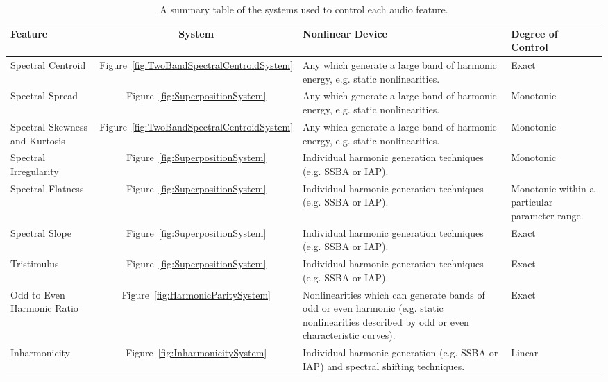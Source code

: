 	\begin{table}[h!]
		\centering
		\begin{tabular}{|C{3cm}|c|C{5cm}|C{3cm}|}
			\hline
			\bf{Feature} & \bf{System} & \bf{Nonlinear Device} & \bf{Degree of Control} \tabularnewline
			\hline
			\hline
			Spectral Centroid & Figure~\ref{fig:TwoBandSpectralCentroidSystem} & 
			Any which generate a large band of harmonic energy, e.g. static nonlinearities. & 
			Exact \tabularnewline
			\hline
			Spectral Spread & Figure~\ref{fig:SuperpositionSystem} & 
			Any which generate a large band of harmonic energy, e.g. static nonlinearities. & 
			Monotonic \tabularnewline
			\hline
			Spectral Skewness and Kurtosis & Figure~\ref{fig:TwoBandSpectralCentroidSystem} & 
			Any which generate a large band of harmonic energy, e.g. static nonlinearities. & 
			Monotonic \tabularnewline
			\hline
			Spectral Irregularity & Figure~\ref{fig:SuperpositionSystem} & 
			Individual harmonic generation techniques (e.g. SSBA or IAP). & 
			Monotonic \tabularnewline
			\hline
			Spectral Flatness & Figure~\ref{fig:SuperpositionSystem} &
			Individual harmonic generation techniques (e.g. SSBA or IAP). & 
			Monotonic within a particular parameter range. \tabularnewline
			\hline
			Spectral Slope & Figure~\ref{fig:SuperpositionSystem} &
			Individual harmonic generation techniques (e.g. SSBA or IAP). & 
			Exact \tabularnewline
			\hline
			Tristimulus & Figure~\ref{fig:SuperpositionSystem} & 
			Individual harmonic generation techniques (e.g. SSBA or IAP). & 
			Exact \tabularnewline			
			\hline
			Odd to Even Harmonic Ratio & Figure~\ref{fig:HarmonicParitySystem} &
			Nonlinearities which can generate bands of odd or even harmonic 
			(e.g. static nonlinearities described by odd or even characteristic curves). & 
			Exact \tabularnewline
			\hline
			Inharmonicity & Figure~\ref{fig:InharmonicitySystem} & 
			Individual harmonic generation (e.g. SSBA or IAP) and spectral shifting techniques. & 
			Linear \tabularnewline
			\hline
		\end{tabular}
		\caption{A summary table of the systems used to control each audio feature.}
		\label{tab:FeatureControlSummary}
	\end{table}
	
